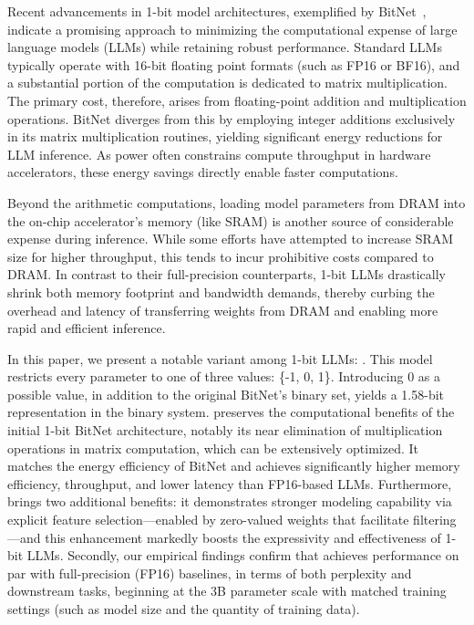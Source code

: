 Recent advancements in 1-bit model architectures, exemplified by BitNet~\cite{bitnet}, indicate a promising approach to minimizing the computational expense of large language models (LLMs) while retaining robust performance. Standard LLMs typically operate with 16-bit floating point formats (such as FP16 or BF16), and a substantial portion of the computation is dedicated to matrix multiplication. The primary cost, therefore, arises from floating-point addition and multiplication operations. BitNet diverges from this by employing integer additions exclusively in its matrix multiplication routines, yielding significant energy reductions for LLM inference. As power often constrains compute throughput in hardware accelerators, these energy savings directly enable faster computations.

Beyond the arithmetic computations, loading model parameters from DRAM into the on-chip accelerator's memory (like SRAM) is another source of considerable expense during inference. While some efforts have attempted to increase SRAM size for higher throughput, this tends to incur prohibitive costs compared to DRAM. In contrast to their full-precision counterparts, 1-bit LLMs drastically shrink both memory footprint and bandwidth demands, thereby curbing the overhead and latency of transferring weights from DRAM and enabling more rapid and efficient inference.

In this paper, we present a notable variant among 1-bit LLMs: \textbf{}. This model restricts every parameter to one of three values: \{-1, 0, 1\}. Introducing 0 as a possible value, in addition to the original BitNet’s binary set, yields a 1.58-bit representation in the binary system.  preserves the computational benefits of the initial 1-bit BitNet architecture, notably its near elimination of multiplication operations in matrix computation, which can be extensively optimized. It matches the energy efficiency of BitNet and achieves significantly higher memory efficiency, throughput, and lower latency than FP16-based LLMs. Furthermore,  brings two additional benefits: it demonstrates stronger modeling capability via explicit feature selection—enabled by zero-valued weights that facilitate filtering—and this enhancement markedly boosts the expressivity and effectiveness of 1-bit LLMs. Secondly, our empirical findings confirm that  achieves performance on par with full-precision (FP16) baselines, in terms of both perplexity and downstream tasks, beginning at the 3B parameter scale with matched training settings (such as model size and the quantity of training data).

